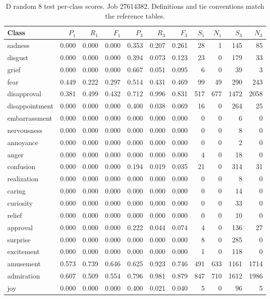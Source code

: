 \begin{table}[!htbp]
\centering
\scriptsize
\setlength{\tabcolsep}{5pt}
\begin{tabular}{lrrrrrrrrrr}
\toprule
Class & $P_1$ & $R_1$ & $F_1$ & $P_3$ & $R_3$ & $F_3$ & $S_1$ & $N_1$ & $S_3$ & $N_3$ \\
\midrule
sadness & 0.000 & 0.000 & 0.000 & 0.353 & 0.207 & 0.261 & 28 & 1 & 145 & 85 \\
disgust & 0.000 & 0.000 & 0.000 & 0.394 & 0.073 & 0.123 & 23 & 0 & 179 & 33 \\
grief & 0.000 & 0.000 & 0.000 & 0.667 & 0.051 & 0.095 & 6 & 0 & 39 & 3 \\
fear & 0.449 & 0.222 & 0.297 & 0.514 & 0.431 & 0.469 & 99 & 49 & 290 & 243 \\
disapproval & 0.381 & 0.499 & 0.432 & 0.712 & 0.996 & 0.831 & 517 & 677 & 1472 & 2058 \\
disappointment & 0.000 & 0.000 & 0.000 & 0.400 & 0.038 & 0.069 & 16 & 0 & 264 & 25 \\
embarrassment & 0.000 & 0.000 & 0.000 & 0.000 & 0.000 & 0.000 & 0 & 0 & 6 & 0 \\
nervousness & 0.000 & 0.000 & 0.000 & 0.000 & 0.000 & 0.000 & 0 & 0 & 8 & 0 \\
annoyance & 0.000 & 0.000 & 0.000 & 0.000 & 0.000 & 0.000 & 0 & 0 & 2 & 0 \\
anger & 0.000 & 0.000 & 0.000 & 0.000 & 0.000 & 0.000 & 4 & 0 & 18 & 0 \\
confusion & 0.000 & 0.000 & 0.000 & 0.194 & 0.019 & 0.035 & 21 & 0 & 314 & 31 \\
realization & 0.000 & 0.000 & 0.000 & 0.000 & 0.000 & 0.000 & 0 & 0 & 8 & 0 \\
caring & 0.000 & 0.000 & 0.000 & 0.000 & 0.000 & 0.000 & 0 & 0 & 14 & 0 \\
curiosity & 0.000 & 0.000 & 0.000 & 0.000 & 0.000 & 0.000 & 0 & 0 & 33 & 0 \\
relief & 0.000 & 0.000 & 0.000 & 0.000 & 0.000 & 0.000 & 0 & 0 & 10 & 0 \\
approval & 0.000 & 0.000 & 0.000 & 0.222 & 0.044 & 0.074 & 4 & 0 & 136 & 27 \\
surprise & 0.000 & 0.000 & 0.000 & 0.000 & 0.000 & 0.000 & 8 & 0 & 285 & 0 \\
excitement & 0.000 & 0.000 & 0.000 & 0.000 & 0.000 & 0.000 & 1 & 0 & 118 & 0 \\
amusement & 0.573 & 0.739 & 0.646 & 0.625 & 0.923 & 0.746 & 491 & 633 & 1161 & 1714 \\
admiration & 0.607 & 0.509 & 0.554 & 0.796 & 0.981 & 0.879 & 847 & 710 & 1612 & 1986 \\
joy & 0.000 & 0.000 & 0.000 & 0.400 & 0.021 & 0.040 & 5 & 0 & 96 & 5 \\
\bottomrule
\end{tabular}
\caption{D random 8 test per-class scores. Job 27614382. Definitions and tie conventions match the reference tables.}
\label{tab:classes-d_random_k8}
\end{table}
